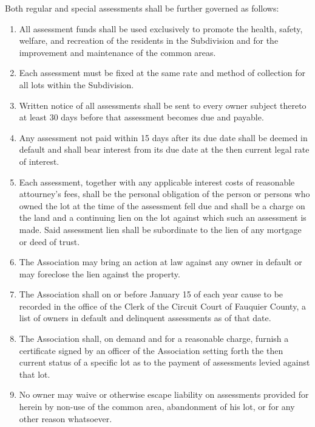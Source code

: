 \documentclass[12pt, letterpaper]{article}
\begin{document}
\begin{enumerate}
Both regular and special assessments shall be further governed as follows:
 \begin{enumerate}
 \item All assessment funds shall be used exclusively to promote the health, safety, welfare, and recreation of the residents in the Subdivision and for the improvement and maintenance of the common areas.
 \item Each assessment must be fixed at the same rate and method of collection for all lots within the Subdivision.
 \item Written notice of all assessments shall be sent to every owner subject thereto at least 30 days before that assessment becomes due and payable.
 \item Any assessment not paid within 15 days after its due date shall be deemed in default and shall bear interest from its due date at the then current legal rate of interest.
 \item Each assessment, together with any applicable interest costs of reasonable attourney's fees, shall be the personal obligation of the person or persons who owned the lot at the time of the assessment fell due and shall be a charge on the land and a continuing lien on the lot against which such an assessment is made.
 Said assessment lien shall be subordinate to the lien of any mortgage or deed of trust.
 \item The Association may bring an action at law against any owner in default or may foreclose the lien against the property.
 \item The Association shall on or before January 15 of each year cause to be recorded in the office of the Clerk of the Circuit Court of Fauquier County, a list of owners in default and delinquent assessments as of that date.
 \item The Association shall, on demand and for a reasonable charge, furnish a certificate signed by an officer of the Association setting forth the then current status of a specific lot as to the payment of assessments levied against that lot.
 \item No owner may waive or otherwise escape liability on assessments provided for herein by non-use of the common area, abandonment of his lot, or for any other reason whatsoever.
 \end{enumerate}
\end{enumerate}
\end{document}
